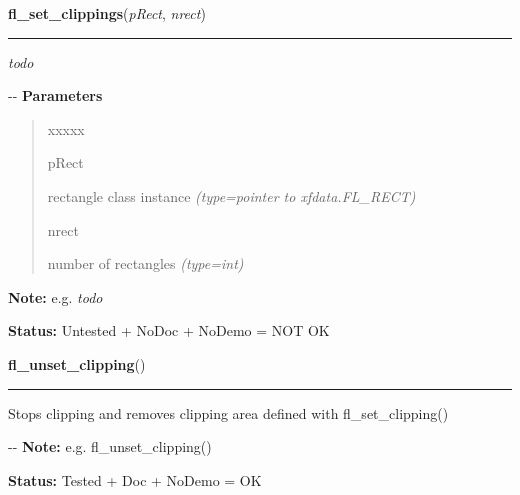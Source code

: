     \vspace{0.5ex}

\hspace{.8\funcindent}\begin{boxedminipage}{\funcwidth}

    \raggedright \textbf{fl\_set\_clippings}(\textit{pRect}, \textit{nrect})

    \vspace{-1.5ex}

    \rule{\textwidth}{0.5\fboxrule}
\setlength{\parskip}{2ex}

\emph{todo}

-{}-
\setlength{\parskip}{1ex}
      \textbf{Parameters}
      \vspace{-1ex}

      \begin{quote}
        \begin{Ventry}{xxxxx}

          \item[pRect]


rectangle class instance
            {\it (type=pointer to xfdata.FL\_RECT)}

          \item[nrect]


number of rectangles
            {\it (type=int)}

        \end{Ventry}

      \end{quote}

\textbf{Note:} 
e.g. \emph{todo}


\textbf{Status:} 
Untested + NoDoc + NoDemo = NOT OK


    \end{boxedminipage}

    \label{xformslib:flxbasic:fl_unset_clipping}

    \vspace{0.5ex}

\hspace{.8\funcindent}\begin{boxedminipage}{\funcwidth}

    \raggedright \textbf{fl\_unset\_clipping}()

    \vspace{-1.5ex}

    \rule{\textwidth}{0.5\fboxrule}
\setlength{\parskip}{2ex}

Stops clipping and removes clipping area defined with
fl\_set\_clipping()

-{}-
\setlength{\parskip}{1ex}
\textbf{Note:} 
e.g. fl\_unset\_clipping()


\textbf{Status:} 
Tested + Doc + NoDemo = OK


    \end{boxedminipage}

